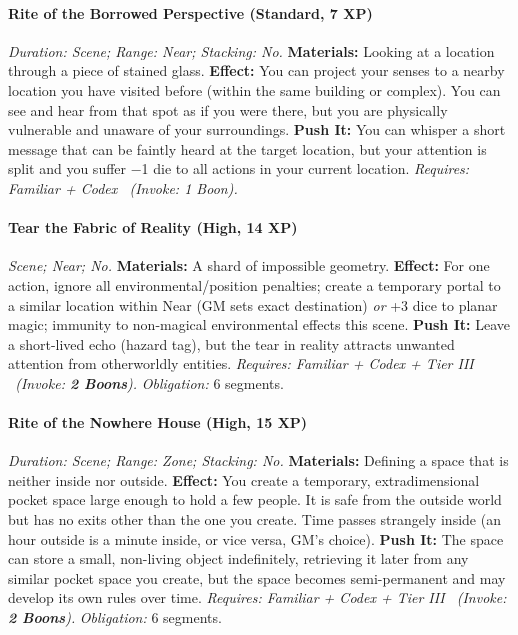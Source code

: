 \paragraph{Rite of the Borrowed Perspective (Standard, 7 XP)} \emph{Duration: Scene; Range: Near; Stacking: No.}
\textbf{Materials:} Looking at a location through a piece of stained glass.
\textbf{Effect:} You can project your senses to a nearby location you have visited before (within the same building or complex). You can see and hear from that spot as if you were there, but you are physically vulnerable and unaware of your surroundings.
\textbf{Push It:} You can whisper a short message that can be faintly heard at the target location, but your attention is split and you suffer −1 die to all actions in your current location.
\emph{Requires: Familiar + Codex \ (\textit{Invoke:} 1 Boon).}
\paragraph{Tear the Fabric of Reality (High, 14 XP)} \emph{Scene; Near; No.}
\textbf{Materials:} A shard of impossible geometry.
\textbf{Effect:} For one action, ignore all environmental/position penalties; create a temporary portal to a similar location within Near (GM sets exact destination) \emph{or} +3 dice to planar magic; immunity to non-magical environmental effects this scene.
\textbf{Push It:} Leave a short-lived echo (hazard tag), but the tear in reality attracts unwanted attention from otherworldly entities.
\emph{Requires: Familiar + Codex + Tier III \ (\textit{Invoke:} \textbf{2 Boons}).}
\emph{Obligation:} 6 segments.

\paragraph{Rite of the Nowhere House (High, 15 XP)} \emph{Duration: Scene; Range: Zone; Stacking: No.}
\textbf{Materials:} Defining a space that is neither inside nor outside.
\textbf{Effect:} You create a temporary, extradimensional pocket space large enough to hold a few people. It is safe from the outside world but has no exits other than the one you create. Time passes strangely inside (an hour outside is a minute inside, or vice versa, GM's choice).
\textbf{Push It:} The space can store a small, non-living object indefinitely, retrieving it later from any similar pocket space you create, but the space becomes semi-permanent and may develop its own rules over time.
\emph{Requires: Familiar + Codex + Tier III \ (\textit{Invoke:} \textbf{2 Boons}).}
\emph{Obligation:} 6 segments.

